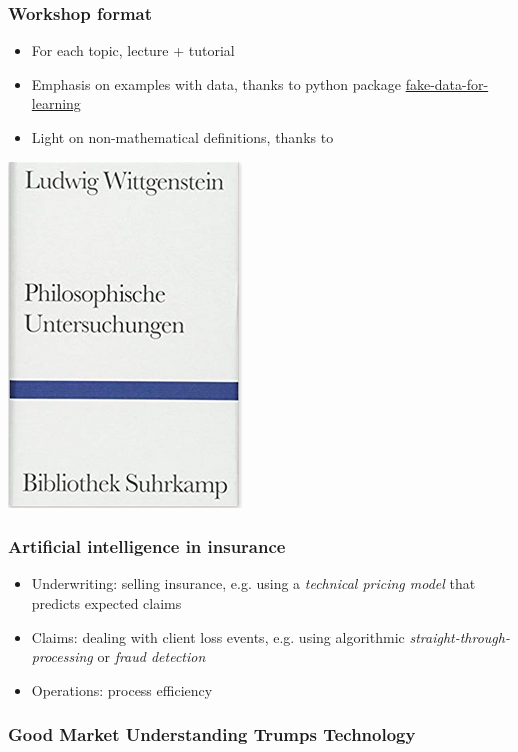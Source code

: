 \begin{frame}
\frametitle{Workshop format}

\begin{itemize}
\item For each topic, lecture + tutorial
\item Emphasis on examples with data, thanks to python package \href{https://munichpavel.github.io/fake-data-for-learning/}{fake-data-for-learning}
\item Light on non-mathematical definitions, thanks to 
\end{itemize}
\centering
\includegraphics[width=0.3\textheight]{graphics/pi_wittgenstein}
\end{frame}

\begin{frame}
  \frametitle{Artificial intelligence in insurance}

  \begin{itemize}
    \item Underwriting: selling insurance, e.g. using a \emph{technical pricing model} that predicts expected claims
    \item Claims: dealing with client loss events, e.g. using algorithmic \emph{straight-through-processing} or \emph{fraud detection}
    \item Operations: process efficiency
  \end{itemize}
\end{frame}

\begin{frame}
\frametitle{Good Market Understanding Trumps Technology}
\centering
{}
\end{frame}

